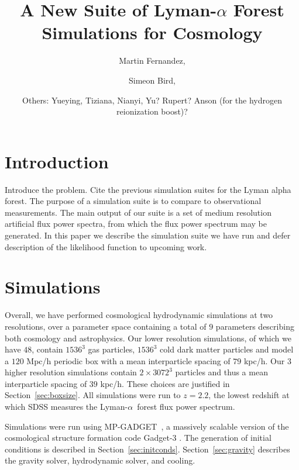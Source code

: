 \documentclass[a4paper,11pt]{article}
\title{A New Suite of Lyman-$\alpha$ Forest Simulations for Cosmology}
\author[a,1]{Martin Fernandez,\note{Corresponding author}}
\author[a]{Simeon Bird,}
\affiliation[a]{Department of Physics \& Astronomy, University of California  Riverside,\\900 University Avenue, Riverside, CA 92521, USA}
\author[b]{Others: Yueying, Tiziana, Nianyi, Yu? Rupert? Anson (for the hydrogen reionization boost)?}
\newcommand{\Lya}{Lyman-$\alpha$}
\newcommand{\mpgadget}{{\small MP-GADGET}}
\begin{document}
\maketitle

\section{Introduction}

Introduce the problem. Cite the previous simulation suites for the Lyman alpha forest. The purpose of a simulation suite is to compare to observational measurements. The main output of our suite is a set of medium resolution artificial flux power spectra, from which the flux power spectrum may be generated. In this paper we describe the simulation suite we have run and defer description of the likelihood function to upcoming work.

\cite{Puchwein:2022}

\section{Simulations}

Overall, we have performed cosmological hydrodynamic simulations at two resolutions, over a parameter space containing a total of $9$ parameters describing both cosmology and astrophysics. Our lower resolution simulations, of which we have $48$, contain $1536^3$ gas particles, $1536^3$ cold dark matter particles and model a $120$ Mpc/h periodic box with a mean interparticle spacing of $79$ kpc/h. Our $3$ higher resolution simulations contain $2\times 3072^3$ particles and thus a mean interparticle spacing of $39$ kpc/h. These choices are justified in Section~\ref{sec:boxsize}. All simulations were run to $z=2.2$, the lowest redshift at which SDSS measures the \Lya~forest flux power spectrum.

Simulations were run using \mpgadget~\cite{MPGadget2018, Bird:2022}, a massively scalable version of the cosmological structure formation code Gadget-3 \cite{Springel:2005}. The generation of initial conditions is described in Section~\ref{sec:initconds}. Section~\ref{sec:gravity} describes the gravity solver, hydrodynamic solver, and cooling.
\end{document}
